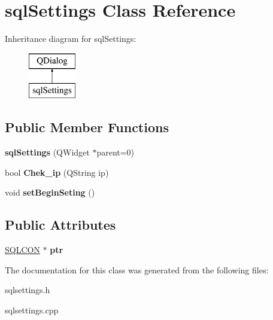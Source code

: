 \hypertarget{classsql_settings}{}\section{sql\+Settings Class Reference}
\label{classsql_settings}
Inheritance diagram for sql\+Settings\+:\begin{figure}[H]
\begin{center}
\leavevmode
\includegraphics[height=2.000000cm]{classsql_settings}
\end{center}
\end{figure}
\subsection*{Public Member Functions}
\begin{DoxyCompactItemize}
\item 
\hypertarget{classsql_settings_afc3f1c17e3411591884f39eb18cc422d}{}\label{classsql_settings_afc3f1c17e3411591884f39eb18cc422d} 
{\bfseries sql\+Settings} (Q\+Widget $\ast$parent=0)
\item 
\hypertarget{classsql_settings_a4cb786c02dcea08898d80b2b81d7968d}{}\label{classsql_settings_a4cb786c02dcea08898d80b2b81d7968d} 
bool {\bfseries Chek\+\_\+ip} (Q\+String ip)
\item 
\hypertarget{classsql_settings_acb4db062330c05fec1054ad55f5a9ea9}{}\label{classsql_settings_acb4db062330c05fec1054ad55f5a9ea9} 
void {\bfseries set\+Begin\+Seting} ()
\end{DoxyCompactItemize}
\subsection*{Public Attributes}
\begin{DoxyCompactItemize}
\item 
\hypertarget{classsql_settings_aaf949d34fdb177a030283c3ec99833b0}{}\label{classsql_settings_aaf949d34fdb177a030283c3ec99833b0} 
\hyperlink{class_s_q_l_c_o_n}{S\+Q\+L\+C\+ON} $\ast$ {\bfseries ptr}
\end{DoxyCompactItemize}


The documentation for this class was generated from the following files\+:\begin{DoxyCompactItemize}
\item 
sqlsettings.\+h\item 
sqlsettings.\+cpp\end{DoxyCompactItemize}
